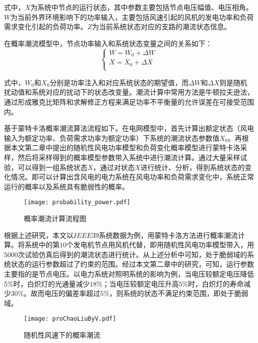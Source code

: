 式中，$X$为系统中节点的运行状态，其中参数主要包括节点电压幅值、电压相角。$W$为当前外界环境影响下的功率输入，主要包括风速引起的风机的发电功率和负荷需求变化引起的负荷功率。$Z$为当前系统状态对应的支路的潮流状态信息。

在概率潮流模型中，节点功率输入和系统状态变量之间的关系如下：
\begin{equation}\label{equ:chap3:Index11}
\left\{\begin{array}{l}
        W=W_0+\Delta W\\
        X=X_0+\Delta X\\
\end{array}\right.
\end{equation}

式中，$W_0$和$X_0$分别是功率注入和对应系统状态的期望值，而$\Delta W$和$\Delta X$则是随机扰动值和系统对应的扰动下的状态改变量。潮流计算中常用方法是牛顿拉夫逊法，通过形成雅克比矩阵和求解修正方程来满足功率不平衡量的允许误差在可接受范围内。

基于蒙特卡洛概率潮流算法流程如下。在电网模型中，首先计算出额定状态（风电输入为额定功率、负荷需求功率为额定功率）下系统的潮流状态参数值$X_0$。再根据本文第二章中提出的随机性风电功率模型和负荷变化概率模型进行蒙特卡洛采样，然后将采样得到的概率模型参数带入系统中进行潮流计算。通过大量采样试验，可以得到一组系统状态$X$，通过对状态$X$进行统计、分析，得到系统状态的变化情况。即可以计算出含风电的电力系统在风电功率和负荷需求变化中，系统正常运行的概率以及系统具有脆弱性的概率。
\begin{figure}[H] %
  \centering
  \texttt{[image: probability\_power.pdf]}
  \caption{概率潮流计算流程图}
  \label{fig:probabilityPower}
\end{figure}

根据上述研究，本文以$IEEE39$系统数据为例，用蒙特卡洛方法进行概率潮流计算。将系统中的第$10$个发电机节点用风机代替，即用随机性风电功率模型带入，用$5000$次试验仿真后得到的潮流状态进行统计。从上述分析中可知，处于脆弱域的系统状态的运行参数超过了约束的范围。经过本文第二章中的研究，可知，运行参数主要指的是节点电压。以电力系统对照明系统的影响为例，当电压较额定电压降低$5\%$时，白炽灯的光通量减少$18\%$；当电压较额定电压升高$5\%$时，白炽灯的寿命减少$30\%$。故而电压的偏差率超过$5\%$，则系统的状态不满足约束范围，即处于脆弱域。
\begin{figure}[H] %
  \centering
  \texttt{[image: proChaoLiuByV.pdf]}
  \caption{随机性风速下的概率潮流}
  \label{fig:proChaoLiuByV}
\end{figure}


